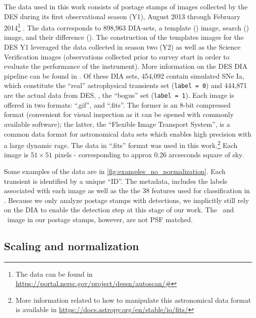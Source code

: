 The data used in this work consists of postage stamps of images collected by the DES during its first observational season (Y1), August 2013 through February 2014\footnote{The data can be found in \url{https://portal.nersc.gov/project/dessn/autoscan/\#}} \citep{Abbott_2018}. The data corresponds to 898,963 DIA-sets, a template (\temp) image, search (\search) image, and their difference (\diff). The construction of the templates images for the DES Y1 leveraged the data collected in season two (Y2) as well as the Science Verification images (observations collected prior to survey start in order to evaluate the performance of the instrument). More information on the DES DIA pipeline can be found in \citep{Kessler_2015}.  Of these DIA sets, 454,092 contain simulated SNe Ia, which constitute the ``real'' astrophysical transients set (\texttt{label = 0}) and 444,871 are the actual data from DES, \ie, the ``bogus'' set (\texttt{label = 1}). Each image is offered in two formats: ``.gif'', and ``.fits''. The former is an 8-bit compressed format (convenient for visual inspection as it can be opened with commonly available software); the latter, the ``Flexible Image Transport System'', is a common data format for astronomical data sets which enables high precision with a large dynamic rage. The data in ``.fits'' format was used in this work.\footnote{More information related to how to manipulate this astronomical data format is available in \url{https://docs.astropy.org/en/stable/io/fits/}} Each image is $51 \times 51$ pixels - corresponding to approx 0.26 
arcseconds square of sky. 

 Some examples of the data are in \autoref{fig:examples_no_normalization}. Each transient is identified by a unique ``ID''. The metadata, includes the labels associated with each image as well as the the $38$ features used for classification in \citet{Goldstein_2015}.
 Because we only analyze postage stamps with detections, we implicitly still rely on the DIA to enable the detection step at this stage of our work. The \temp\ and \diff\ image in our postage stamps, however, are not PSF matched.


\subsection{Scaling and normalization}\label{subsec:scaling}


